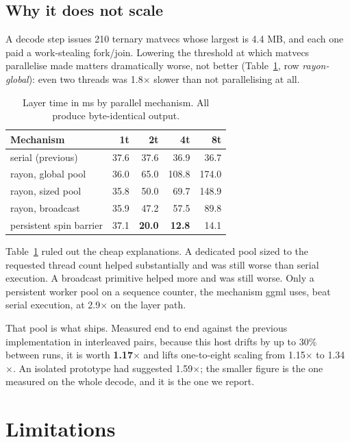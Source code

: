 \documentclass[10pt,twocolumn]{article}
\begin{document}
\subsection{Why it does not scale}

A decode step issues 210 ternary matvecs whose largest is 4.4 MB, and each one
paid a work-stealing fork/join. Lowering the threshold at which matvecs
parallelise made matters dramatically worse, not better
(Table~\ref{tab:par}, row \emph{rayon-global}): even two threads was
1.8$\times$ slower than not parallelising at all.

\begin{table}[t]
\centering
\small
\begin{tabular}{lrrrr}
\toprule
Mechanism & 1t & 2t & 4t & 8t \\
\midrule
serial (previous) & 37.6 & 37.6 & 36.9 & 36.7 \\
rayon, global pool& 36.0 & 65.0 & 108.8& 174.0 \\
rayon, sized pool & 35.8 & 50.0 & 69.7 & 148.9 \\
rayon, broadcast  & 35.9 & 47.2 & 57.5 & 89.8 \\
persistent spin barrier & 37.1 & \textbf{20.0} & \textbf{12.8} & 14.1 \\
\bottomrule
\end{tabular}
\caption{Layer time in ms by parallel mechanism. All produce byte-identical
output.}
\label{tab:par}
\end{table}

Table~\ref{tab:par} ruled out the cheap explanations. A dedicated pool sized to
the requested thread count helped substantially and was still worse than serial
execution. A broadcast primitive helped more and was still worse. Only a
persistent worker pool on a sequence counter, the mechanism ggml uses, beat
serial execution, at 2.9$\times$ on the layer path.

That pool is what ships. Measured end to end against the previous
implementation in interleaved pairs, because this host drifts by up to 30\%
between runs, it is worth \textbf{1.17}$\times$ and lifts one-to-eight scaling
from 1.15$\times$ to 1.34$\times$. An isolated prototype had suggested
1.59$\times$; the smaller figure is the one measured on the whole decode, and it
is the one we report.

\section{Limitations}
\end{document}
